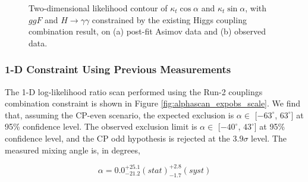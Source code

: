 \begin{figure}[htbp]
  \centering
  \caption{Two-dimensional likelihood contour of $\kappa_t \cos\alpha$ and $\kappa_t \sin\alpha$, with $ggF$ and $H \rightarrow \gamma\gamma$ constrained by the existing Higgs coupling combination result, on (a) post-fit Asimov data and (b) observed data.
  \label{fig:s2:contours}}
\end{figure}

\subsubsection{1-D Constraint Using Previous Measurements}

The 1-D log-likelihood ratio scan performed using the Run-2 couplings combination constraint is shown in Figure \ref{fig:alphascan_expobs_scale}. We find that, assuming the CP-even scenario, the expected exclusion is $\alpha \in$ [$-63^{\circ}$, $63^{\circ}$] at 95\% confidence level. The observed exclusion limit is  $\alpha \in$ [$-40^{\circ}$, $43^{\circ}$] at 95\% confidence level, and the CP odd hypothesis is rejected at the $3.9\sigma$ level. The measured mixing angle is, in degrees, 

\begin{equation}
\alpha = 0.0^{+25.1}_{-21.2}(stat)^{+2.8}_{-1.7}(syst)
\end{equation}

